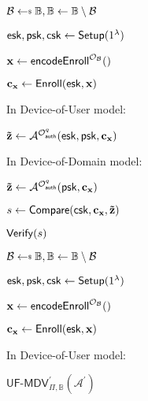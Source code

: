 \begin{figure}[h]
\centering

	\begin{minipage}[t]{0.45\linewidth}
	\begin{algorithm}[H]
	\caption{$\textsf{UF-MDV}_{\Pi, \mathbb{B}}(\mathcal{A})$}
	\label{alg:uf-mdv_game}
	\begin{algorithmic}[1]
		\State $\mathcal{B} \getsdollar \mathbb{B}, \mathbb{B} \gets \mathbb{B} \setminus \mathcal{B}$

		\State ${\sf esk}, {\sf psk}, {\sf csk} \gets {\sf Setup}(1^\lambda)$

		\State $\mathbf{x} \gets {\sf encodeEnroll}^{\mathcal{O}_{\mathcal{B}}}()$

		\State $\mathbf{c_x} \gets {\sf Enroll}({\sf esk}, \mathbf{x})$

		\State In Device-of-User model:
		
		\State \hspace{\algorithmicindent} ${\mathbf{\tilde{z}}} \gets \mathcal{A}^{ \mathcal{O}_{\sf auth}^q } ({\sf esk}, {\sf psk}, \mathbf{c_x} )$

		\State In Device-of-Domain model:
		
		\State \hspace{\algorithmicindent} ${\mathbf{\tilde{z}}} \gets \mathcal{A}^{ \mathcal{O}_{\sf auth}^q } ( {\sf psk}, \mathbf{c_x} )$

		\State $s \gets {\sf Compare}( {\sf csk}, \mathbf{c_x}, \mathbf{\tilde{z}} )$

		\State \Return ${\sf Verify}(s)$
	\end{algorithmic}
	\end{algorithm}
	\end{minipage}
	\begin{minipage}[t]{0.45\linewidth}
	\begin{algorithm}[H]
	\caption{$\textsf{UF-MDV}^\prime_{\Pi, \mathbb{B}}(\mathcal{A}^\prime)$}
	\label{alg:plain_uf-mdv_game}
	\begin{algorithmic}[1]
		\State $\mathcal{B} \getsdollar \mathbb{B}, \mathbb{B} \gets \mathbb{B} \setminus \mathcal{B}$

		\State ${\sf esk}, {\sf psk}, {\sf csk} \gets {\sf Setup}(1^\lambda)$

		\State $\mathbf{x} \gets {\sf encodeEnroll}^{\mathcal{O}_{\mathcal{B}}}()$

		\State $\mathbf{c_x} \gets {\sf Enroll}({\sf esk}, \mathbf{x})$

		\State In Device-of-User model:
		

\end{algorithmic}
\end{algorithm}
\end{minipage}
\end{figure}
